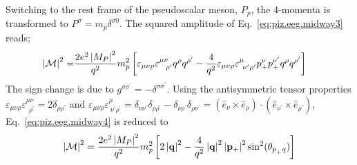 Switching to the rest frame of the pseudoscalar meson, $P_p$, the 4-momenta is transformed to $P^\sigma = m_p\delta^{\sigma 0}$. The squared amplitude of Eq.~\ref{eq:piz.eeg.midway3} reads;
\begin{align} \label{eq:piz.eeg.midway4}
\left|{\cal M}\right|^{2} = & \frac{2e^{2}\left|M_{P}\right|^{2}}{q^{2}}m_p^2
\left[\varepsilon_{\mu\nu\rho}\varepsilon^{\mu\nu}_{\ \ \rho^{\prime}}q^{\rho}q^{\rho^{\prime}} - \frac{4}{q^2} \varepsilon_{\mu\nu\rho}\varepsilon^{\mu}_{\ \nu^{\prime}\rho^{\prime}} p_{+}^{\nu}p_{+}^{\nu^{\prime}}q^{\rho}q^{\rho^{\prime}}\right]
\end{align}
The sign change is due to $g^{\sigma \sigma^{\prime}} = -\delta^{\sigma \sigma^{\prime}}$. 
Using the antisymmetric tensor properties $\varepsilon_{\mu\nu\rho}\varepsilon^{\mu\nu}_{\ \ \rho^{\prime}} = 2\delta_{\rho\rho^{\prime}}$ and $\varepsilon_{\mu\nu\rho}\varepsilon^{\mu}_{\ \nu^{\prime}\rho^{\prime}} = \delta_{\nu\nu^{\prime}}\delta_{\rho\rho^{\prime}} - \delta_{\nu\rho^{\prime}}\delta_{\rho\nu^{\prime}} = (\hat{e}_{\nu} \times \hat{e}_{\rho}) \cdot (\hat{e}_{\nu^{\prime}} \times \hat{e}_{\rho^{\prime}})$, Eq.~\ref{eq:piz.eeg.midway4} is reduced to 
\begin{align} \label{eq:piz.eeg.final}
\left|{\cal M}\right|^{2} =  \frac{2e^{2}\left|M_{P}\right|^{2}}{q^{2}}m_p^2
\left[2\left|\bf{q}\right|^2 - \frac{4}{q^2} \left|\bf{q}\right|^2 \left|\bf{p_{+}}\right|^2 \sin^2(\theta_{p_{_+}q}) \right]
\end{align}

